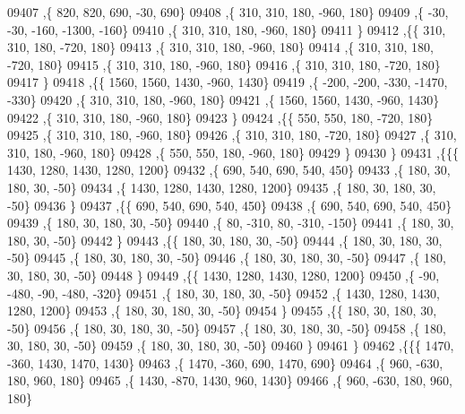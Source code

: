 \begin{DoxyCode}
09407     ,\{   820,   820,   690,   -30,   690\}
09408     ,\{   310,   310,   180,  -960,   180\}
09409     ,\{   -30,   -30,  -160, -1300,  -160\}
09410     ,\{   310,   310,   180,  -960,   180\}
09411     \}
09412    ,\{\{   310,   310,   180,  -720,   180\}
09413     ,\{   310,   310,   180,  -960,   180\}
09414     ,\{   310,   310,   180,  -720,   180\}
09415     ,\{   310,   310,   180,  -960,   180\}
09416     ,\{   310,   310,   180,  -720,   180\}
09417     \}
09418    ,\{\{  1560,  1560,  1430,  -960,  1430\}
09419     ,\{  -200,  -200,  -330, -1470,  -330\}
09420     ,\{   310,   310,   180,  -960,   180\}
09421     ,\{  1560,  1560,  1430,  -960,  1430\}
09422     ,\{   310,   310,   180,  -960,   180\}
09423     \}
09424    ,\{\{   550,   550,   180,  -720,   180\}
09425     ,\{   310,   310,   180,  -960,   180\}
09426     ,\{   310,   310,   180,  -720,   180\}
09427     ,\{   310,   310,   180,  -960,   180\}
09428     ,\{   550,   550,   180,  -960,   180\}
09429     \}
09430    \}
09431   ,\{\{\{  1430,  1280,  1430,  1280,  1200\}
09432     ,\{   690,   540,   690,   540,   450\}
09433     ,\{   180,    30,   180,    30,   -50\}
09434     ,\{  1430,  1280,  1430,  1280,  1200\}
09435     ,\{   180,    30,   180,    30,   -50\}
09436     \}
09437    ,\{\{   690,   540,   690,   540,   450\}
09438     ,\{   690,   540,   690,   540,   450\}
09439     ,\{   180,    30,   180,    30,   -50\}
09440     ,\{    80,  -310,    80,  -310,  -150\}
09441     ,\{   180,    30,   180,    30,   -50\}
09442     \}
09443    ,\{\{   180,    30,   180,    30,   -50\}
09444     ,\{   180,    30,   180,    30,   -50\}
09445     ,\{   180,    30,   180,    30,   -50\}
09446     ,\{   180,    30,   180,    30,   -50\}
09447     ,\{   180,    30,   180,    30,   -50\}
09448     \}
09449    ,\{\{  1430,  1280,  1430,  1280,  1200\}
09450     ,\{   -90,  -480,   -90,  -480,  -320\}
09451     ,\{   180,    30,   180,    30,   -50\}
09452     ,\{  1430,  1280,  1430,  1280,  1200\}
09453     ,\{   180,    30,   180,    30,   -50\}
09454     \}
09455    ,\{\{   180,    30,   180,    30,   -50\}
09456     ,\{   180,    30,   180,    30,   -50\}
09457     ,\{   180,    30,   180,    30,   -50\}
09458     ,\{   180,    30,   180,    30,   -50\}
09459     ,\{   180,    30,   180,    30,   -50\}
09460     \}
09461    \}
09462   ,\{\{\{  1470,  -360,  1430,  1470,  1430\}
09463     ,\{  1470,  -360,   690,  1470,   690\}
09464     ,\{   960,  -630,   180,   960,   180\}
09465     ,\{  1430,  -870,  1430,   960,  1430\}
09466     ,\{   960,  -630,   180,   960,   180\}

\end{DoxyCode}
